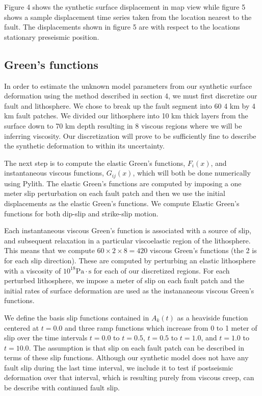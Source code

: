\documentclass[12pt]{article}
\begin{document}
Figure 4 shows the synthetic surface displacement in map view while
figure 5 shows a sample displacement time series taken from the
location nearest to the fault.  The displacements shown in figure 5
are with respect to the locations stationary preseismic position.  

\subsection{Green's functions}
In order to estimate the unknown model parameters from our
synthetic surface deformation using the method described in section 4,
we must first discretize our fault and lithosphere.  We chose
to break up the fault segment into 60 4 km by 4 km fault patches. We
divided our lithosphere into 10 km thick layers from the surface down
to 70 km depth resulting in 8 viscous regions where we will be
inferring viscosity. Our discretization will prove to be sufficiently
fine to describe the synthetic deformation to within its uncertainty.

The next step is to compute the elastic Green's functions, $F_i(x)$, and
instantaneous viscous functions, $G_{ij}(x)$, which will both be done
numerically using Pylith.  The elastic Green’s functions are computed
by imposing a one meter slip perturbation on each fault patch and then
we use the initial displacements as the elastic Green’s functions.  We
compute Elastic Green's functions for both dip-slip and
strike-slip motion. 

Each instantaneous viscous Green’s function is associated with a
source of slip, and subsequent relaxation in a particular viscoelastic
region of the lithosphere.  This means that we compute
$60\times2\times8=420$ viscous Green's functions (the 2 is for each
slip direction).  These are computed by perturbing an elastic
lithosphere with a viscosity of $10^{18}\mathrm{Pa}\cdot\mathrm{s}$
for each of our discretized regions.  For each perturbed lithosphere,
we impose a meter of slip on each fault patch and the initial rates of
surface deformation are used as the instananeous viscous Green's
functions.

We define the basis slip functions contained in $A_k(t)$ as a
heaviside function centered at $t=0.0$ and three ramp functions which
increase from 0 to 1 meter of slip over the time intervals $t=0.0$ to
$t=0.5$, $t=0.5$ to $t=1.0$, and $t=1.0$ to $t=10.0$.  The assumption
is that slip on each fault patch can be described in terms of these
slip functions.  Although our synthetic model does not have any fault
slip during the last time interval, we include it to test if
postseismic deformation over that interval, which is resulting purely
from viscous creep, can be describe with continued fault slip.
\end{document}
